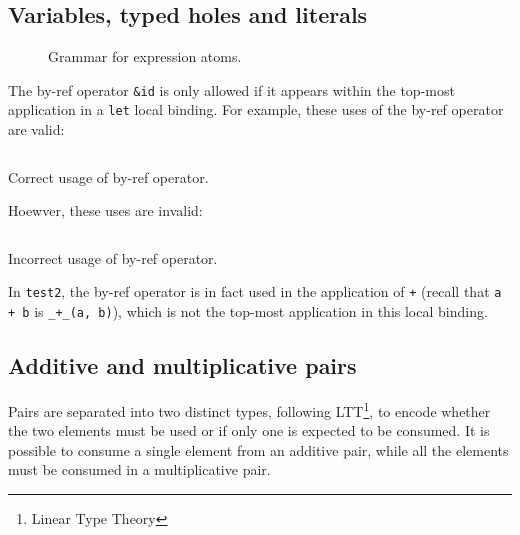 \subsection{Variables, typed holes and literals}\label{subsec:zilch-grammar-expressions-basicexpr}

\begin{figure}[H]
	\centering


	\caption{Grammar for expression atoms.}
	\label{fig:zilch-grammar-expressions-atom-grammar}
\end{figure}

The by-ref operator \texttt{\&id} is only allowed if it appears within the top-most application in a \texttt{let} local binding.
For example, these uses of the by-ref operator are valid:
\begin{listing}[H]
	\inputminted{\zilchlexer}{examples/correct-byref.zc}

	\captionsetup{style=invisible}
	\caption{Correct usage of by-ref operator.}
\end{listing}
\vspace*{-\baselineskip}

Hoewver, these uses are invalid:
\begin{listing}[H]
	\inputminted{\zilchlexer}{examples/incorrect-byref.zc}

	\captionsetup{style=invisible}
	\caption{Incorrect usage of by-ref operator.}
\end{listing}
\vspace*{-\baselineskip}
In \texttt{test2}, the by-ref operator is in fact used in the application of \texttt{+} (recall that \texttt{a + b} is \texttt{\_+\_(a, b)}), which is not the top-most application in this local binding.

\subsection{Additive and multiplicative pairs}\label{subsec:zilch-grammar-expressions-pairs}

Pairs are separated into two distinct types, following LTT\footnote{Linear Type Theory}, to encode whether the two elements must be used or if only one is expected to be consumed.
It is possible to consume a single element from an additive pair, while all the elements must be consumed in a multiplicative pair.

